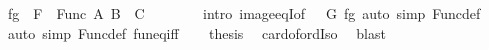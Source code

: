 \begin{isabellebody}
\ {\isachardoublequoteopen}fg\ {\isasymin}\ {\isacharquery}{\kern0pt}F\ {\isacharbackquote}{\kern0pt}\ Func\ A\ {\isacharparenleft}{\kern0pt}B\ {\isasymtimes}\ C{\isacharparenright}{\kern0pt}{\isachardoublequoteclose}\isanewline
\ \ \ \ \ \ \isamarkupfalse%
\ {\isacharparenleft}{\kern0pt}intro\ image{\isacharunderscore}{\kern0pt}eqI{\isacharbrackleft}{\kern0pt}of\ {\isacharunderscore}{\kern0pt}\ {\isacharunderscore}{\kern0pt}\ {\isachardoublequoteopen}{\isacharquery}{\kern0pt}G\ fg{\isachardoublequoteclose}{\isacharbrackright}{\kern0pt}{\isacharparenright}{\kern0pt}\ {\isacharparenleft}{\kern0pt}auto\ simp{\isacharcolon}{\kern0pt}\ Func{\isacharunderscore}{\kern0pt}def{\isacharparenright}{\kern0pt}\isanewline
\ \ \isamarkupfalse%
\ {\isacharparenleft}{\kern0pt}auto\ simp{\isacharcolon}{\kern0pt}\ Func{\isacharunderscore}{\kern0pt}def\ fun{\isacharunderscore}{\kern0pt}eq{\isacharunderscore}{\kern0pt}iff{\isacharparenright}{\kern0pt}\isanewline
\ \ \isamarkupfalse%
\ {\isacharquery}{\kern0pt}thesis\ \isamarkupfalse%
\ card{\isacharunderscore}{\kern0pt}of{\isacharunderscore}{\kern0pt}ordIso\ \isamarkupfalse%
\ blast\isanewline
{}\isamarkupfalse%
%
\endisatagproof
{\isafoldproof}%
%
\isadelimproof
\isanewline
%
\endisadelimproof
%
\isadelimtheory
\isanewline
%
\endisadelimtheory
%
\isatagtheory
{}\isamarkupfalse%
%
\endisatagtheory
{\isafoldtheory}%
%
\isadelimtheory
%
\endisadelimtheory
%
\end{isabellebody}%
\endinput

